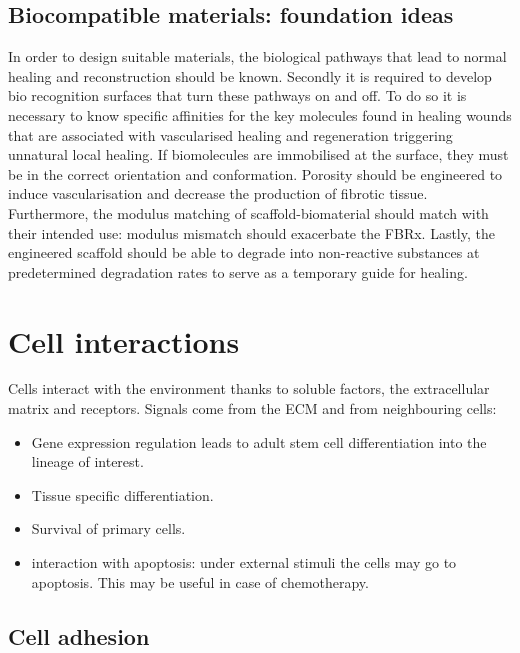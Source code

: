 	\subsection{Biocompatible materials: foundation ideas}
	In order to design suitable materials, the biological pathways that lead to normal healing and reconstruction should be known.
	Secondly it is required to develop bio recognition surfaces that turn these pathways on and off.
	To do so it is necessary to know specific affinities for the key molecules found in healing wounds that are associated with vascularised healing and regeneration triggering unnatural local healing.
	If biomolecules are immobilised at the surface, they must be in the correct orientation and conformation.
	Porosity should be engineered to induce vascularisation and decrease the production of fibrotic tissue.
	Furthermore, the modulus matching of scaffold-biomaterial should match with their intended use: modulus mismatch should exacerbate the FBRx.
	Lastly, the engineered scaffold should be able to degrade into non-reactive substances at predetermined degradation rates to serve as a temporary guide for healing.

\section{Cell interactions}
Cells interact with the environment thanks to soluble factors, the extracellular matrix and receptors.
Signals come from the ECM and from neighbouring cells:

\begin{multicols}{2}
	\begin{itemize}
		\item Gene expression regulation leads to adult stem cell differentiation into the lineage of interest.
		\item Tissue specific differentiation.
		\item Survival of primary cells.
		\item interaction with apoptosis: under external stimuli the cells may go to apoptosis.
			This may be useful in case of chemotherapy.
	\end{itemize}
\end{multicols}

	\subsection{Cell adhesion}

